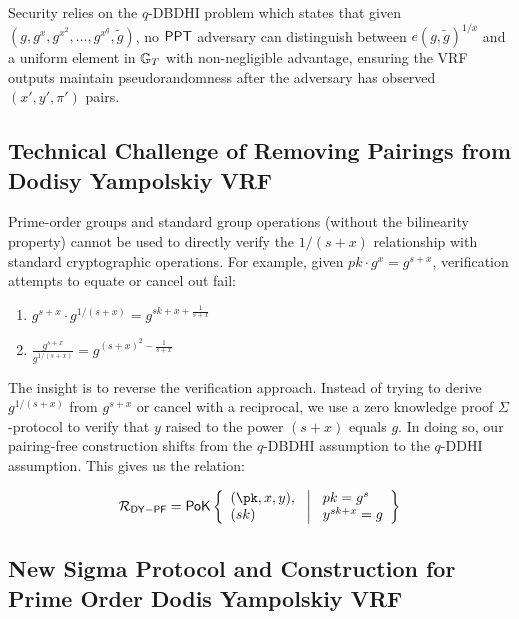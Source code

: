 Security relies on the $q$-DBDHI problem which states that given $(g, g^x, g^{x^2}, \ldots, g^{x^q}, \tilde{g})$, no $\mathsf{PPT}$ adversary can distinguish between $e(g,\tilde{g})^{1/x}$ and a uniform element in $\mathbb{G}_T$ with non-negligible advantage, ensuring the VRF outputs maintain pseudorandomness after the adversary has observed $(x',y',\pi')$ pairs.

\subsection{Technical Challenge of Removing Pairings from Dodisy Yampolskiy VRF}

Prime-order groups and standard group operations (without the bilinearity property) cannot be used to directly verify the $1/(s+x)$ relationship with standard cryptographic operations. For example, given $pk  \cdot g^x = g^{s+x}$, verification attempts to equate or cancel out fail:

\begin{enumerate}
    \item $g^{s+x} \cdot g^{1/(s+x)} = g^{sk + x + \frac{1}{s+x}}$
    \item $\frac{g^{s+x}}{g^{1/(s+x)}} = g^{(s+x)^2-\frac{1}{s+x}}$
\end{enumerate}

The insight is to reverse the verification approach. Instead of trying to derive $g^{1/(s+x)}$ from $g^{s+x}$ or cancel with a reciprocal, we use a zero knowledge proof $\Sigma$-protocol to verify that $y$ raised to the power $(s+x)$ equals $g$. In doing so, our pairing-free construction shifts from the $q$-DBDHI assumption to the $q$-DDHI assumption. This gives us the relation:

\[
\mathcal{R}_{\mathsf{DY-PF}} = \zkpok \left\{ 
\begin{array}{l} 
(\pk, x, y),\\
(sk) 
\end{array}
\ \middle|
\ \begin{array}{l}
pk = g^{s} \\
y^{sk + x} = g  \\
\end{array} \right\}
\]

\subsection{New Sigma Protocol and Construction for Prime Order Dodis Yampolskiy VRF}\label{sec-dy-pf}

